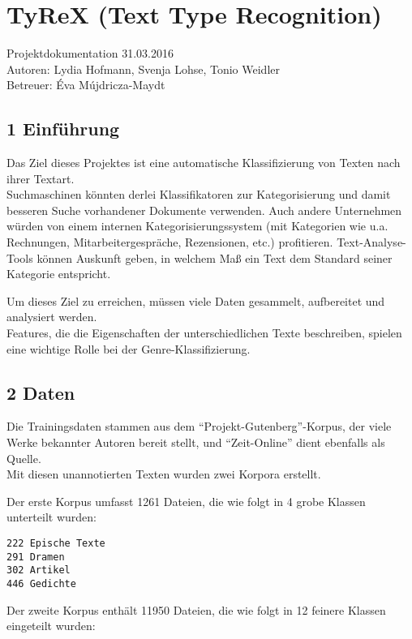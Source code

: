 \documentclass[]{article}
\date{}
\begin{document}
\section*{TyReX (Text Type
Recognition)}\label{tyrex-text-type-recognition}

Projektdokumentation 31.03.2016\\
Autoren: Lydia Hofmann, Svenja Lohse, Tonio Weidler\\
Betreuer: Éva Mújdricza-Maydt

{
\setcounter{tocdepth}{3}
\tableofcontents
}

\subsection{1 Einführung}\label{einfuxfchrung}

Das Ziel dieses Projektes ist eine automatische Klassifizierung von
Texten nach ihrer Textart.\\
Suchmaschinen könnten derlei Klassifikatoren zur Kategorisierung und
damit besseren Suche vorhandener Dokumente verwenden. Auch andere
Unternehmen würden von einem internen Kategorisierungssystem (mit
Kategorien wie u.a. Rechnungen, Mitarbeitergespräche, Rezensionen, etc.)
profitieren. Text-Analyse-Tools können Auskunft geben, in welchem Maß
ein Text dem Standard seiner Kategorie entspricht.

Um dieses Ziel zu erreichen, müssen viele Daten gesammelt, aufbereitet
und analysiert werden.\\
Features, die die Eigenschaften der unterschiedlichen Texte beschreiben,
spielen eine wichtige Rolle bei der Genre-Klassifizierung.

\subsection{2 Daten}\label{daten}

Die Trainingsdaten stammen aus dem ``Projekt-Gutenberg''-Korpus, der
viele Werke bekannter Autoren bereit stellt, und ``Zeit-Online'' dient
ebenfalls als Quelle.\\
Mit diesen unannotierten Texten wurden zwei Korpora erstellt.

Der erste Korpus umfasst 1261 Dateien, die wie folgt in 4 grobe Klassen
unterteilt wurden:

\vspace{4 mm}\vspace{4 mm}\begin{verbatim}
222 Epische Texte
291 Dramen
302 Artikel
446 Gedichte
\end{verbatim}\vspace{4 mm}
\pagebreak
Der zweite Korpus enthält 11950 Dateien, die wie folgt in 12 feinere
Klassen eingeteilt wurden:
\end{document}
